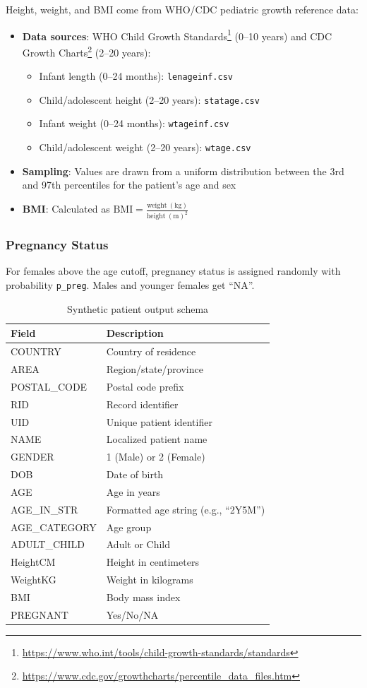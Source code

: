 Height, weight, and BMI come from WHO/CDC pediatric growth reference data:
\begin{itemize}
    \item \textbf{Data sources}: WHO Child Growth Standards\footnote{\url{https://www.who.int/tools/child-growth-standards/standards}} (0--10 years) and CDC Growth Charts\footnote{\url{https://www.cdc.gov/growthcharts/percentile_data_files.htm}} (2--20 years):
    \begin{itemize}
        \item Infant length (0--24 months): \texttt{lenageinf.csv}
        \item Child/adolescent height (2--20 years): \texttt{statage.csv}
        \item Infant weight (0--24 months): \texttt{wtageinf.csv}
        \item Child/adolescent weight (2--20 years): \texttt{wtage.csv}
    \end{itemize}
    \item \textbf{Sampling}: Values are drawn from a uniform distribution between the 3rd and 97th percentiles for the patient's age and sex
    \item \textbf{BMI}: Calculated as $\mathrm{BMI} = \frac{\mathrm{weight~(kg)}}{\mathrm{height~(m)}^2}$
\end{itemize}

\subsubsection{Pregnancy Status}

For females above the age cutoff, pregnancy status is assigned randomly with probability \texttt{p\_preg}. Males and younger females get ``NA''.
\begin{table}[h]
\centering
\begin{tabular}{ll}
\hline
\textbf{Field} & \textbf{Description} \\
\hline
COUNTRY & Country of residence \\
AREA & Region/state/province \\
POSTAL\_CODE & Postal code prefix \\
RID & Record identifier \\
UID & Unique patient identifier \\
NAME & Localized patient name \\
GENDER & 1 (Male) or 2 (Female) \\
DOB & Date of birth \\
AGE & Age in years \\
AGE\_IN\_STR & Formatted age string (e.g., ``2Y5M'') \\
AGE\_CATEGORY & Age group \\
ADULT\_CHILD & Adult or Child \\
HeightCM & Height in centimeters \\
WeightKG & Weight in kilograms \\
BMI & Body mass index \\
PREGNANT & Yes/No/NA \\
\hline
\end{tabular}
\caption{Synthetic patient output schema}
\label{tab:patient_schema}
\end{table}

